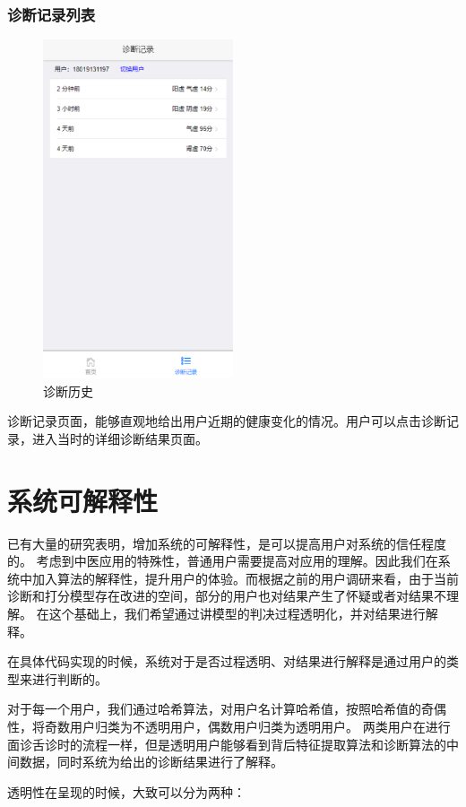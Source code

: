 \subsubsection{诊断记录列表}
\begin{figure}[ht]
    \centering
    \includegraphics[height=10cm]{images/history.png}
    \caption{诊断历史}
    \label{fig:history}
\end{figure}
诊断记录页面，能够直观地给出用户近期的健康变化的情况。用户可以点击诊断记录，进入当时的详细诊断结果页面。

\section{系统可解释性}

已有大量的研究表明，增加系统的可解释性，是可以提高用户对系统的信任程度的。
考虑到中医应用的特殊性，普通用户需要提高对应用的理解。因此我们在系统中加入算法的解释性，提升用户的体验。而根据之前的用户调研来看，由于当前诊断和打分模型存在改进的空间，部分的用户也对结果产生了怀疑或者对结果不理解。
在这个基础上，我们希望通过讲模型的判决过程透明化，并对结果进行解释。

在具体代码实现的时候，系统对于是否过程透明、对结果进行解释是通过用户的类型来进行判断的。

对于每一个用户，我们通过哈希算法，对用户名计算哈希值，按照哈希值的奇偶性，将奇数用户归类为不透明用户，偶数用户归类为透明用户。
两类用户在进行面诊舌诊时的流程一样，但是透明用户能够看到背后特征提取算法和诊断算法的中间数据，同时系统为给出的诊断结果进行了解释。


透明性在呈现的时候，大致可以分为两种：

